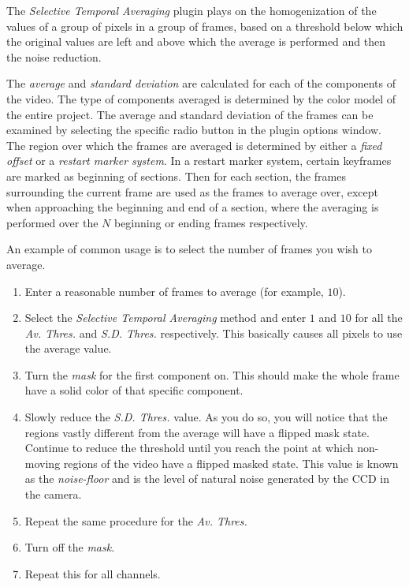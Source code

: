 The \textit{Selective Temporal Averaging} plugin plays on the homogenization of the values of a group of pixels in a group of frames, based on a threshold below which the original values are left and above which the average is performed and then the noise reduction.

The \textit{average} and \textit{standard deviation} are calculated for each of the components of the video. The type of components averaged is determined by the color model of the entire project. The average and standard deviation of the frames can be examined by selecting the specific radio button in the plugin options window.
The region over which the frames are averaged is determined by either a \textit{fixed offset} or a \textit{restart marker system}. In a restart marker system, certain keyframes are marked as beginning of sections. Then for each section, the frames surrounding the current frame are used as the frames to average over, except when approaching the beginning and end of a section, where the averaging is performed over the $N$ beginning or ending frames respectively.

An example of common usage is to select the number of frames you wish to average.

\begin{enumerate}
    \item Enter a reasonable number of frames to average (for example, $10$).
    \item Select the \textit{Selective Temporal Averaging} method and enter $1$ and $10$ for all the \textit{Av. Thres.} and \textit{S.D. Thres.} respectively. This basically causes all pixels to use the average value.
    \item Turn the \textit{mask} for the first component on. This should make the whole frame have a solid color of that specific component.
    \item Slowly reduce the \textit{S.D. Thres.} value. As you do so, you will notice that the regions vastly different from the average will have a flipped mask state. Continue to reduce the threshold until you reach the point at which non-moving regions of the video have a flipped masked state. This value is known as the \textit{noise-floor} and is the level of natural noise generated by the CCD in the camera.
    \item Repeat the same procedure for the \textit{Av. Thres.}
    \item Turn off the \textit{mask}.
    \item Repeat this for all channels.
\end{enumerate}

